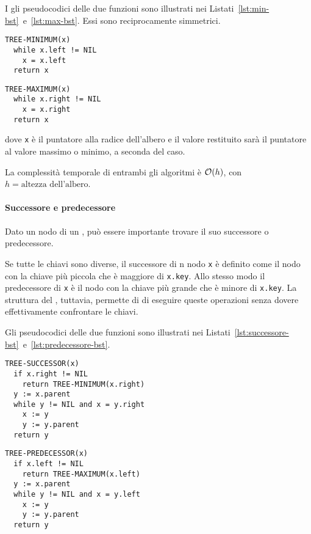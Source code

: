 \documentclass[italian, 10pt]{article}
\begin{document}
I gli pseudocodici delle due funzioni sono illustrati nei Listati~\ref{lst:min-bst}~e~\ref{lst:max-bst}.
Essi sono reciprocamente simmetrici.

\begin{minipage}[t]{0.495\textwidth}
  \begin{lstlisting}[style=pseudocode, caption={Minimo di un BST}, label={lst:min-bst}]
TREE-MINIMUM(x)
  while x.left != NIL
    x = x.left
  return x
  \end{lstlisting}
\end{minipage}
\begin{minipage}[t]{0.495\textwidth}
  \begin{lstlisting}[style=pseudocode, caption={Massimo di un BST}, label={lst:max-bst}]
TREE-MAXIMUM(x)
  while x.right != NIL
    x = x.right
  return x
  \end{lstlisting}
\end{minipage}

dove \texttt{x} è il puntatore alla radice dell'albero e il valore restituito sarà il puntatore al valore massimo o minimo, a seconda del caso.

\bigskip
La complessità temporale di entrambi gli algoritmi è \(\mathcal{O}(h)\), con \(h = \text{altezza dell'albero}\).

\paragraph{Successore e predecessore}
\label{par:successore-predecessore-bst}

Dato un nodo di un \BST, può essere importante trovare il suo successore o predecessore.

Se tutte le chiavi sono diverse, il successore di n nodo \texttt{x} è definito come il nodo con la chiave più piccola che è maggiore di \texttt{x.key}.
Allo stesso modo il predecessore di \texttt{x} è il nodo con la chiave più grande che è minore di \texttt{x.key}.
La struttura del \BST, tuttavia, permette di di eseguire queste operazioni senza dovere effettivamente confrontare le chiavi.

Gli pseudocodici delle due funzioni sono illustrati nei Listati~\ref{lst:successore-bst}~e~\ref{lst:predecessore-bst}.

\begin{minipage}[t]{0.495\textwidth}
  \begin{lstlisting}[style=pseudocode, caption={Successore di di un nodo}, label={lst:successore-bst}]
TREE-SUCCESSOR(x)
  if x.right != NIL
    return TREE-MINIMUM(x.right)
  y := x.parent
  while y != NIL and x = y.right
    x := y
    y := y.parent
  return y
  \end{lstlisting}
\end{minipage}
\begin{minipage}[t]{0.495\textwidth}
  \begin{lstlisting}[style=pseudocode, caption={Predecessore di di un nodo}, label={lst:predecessore-bst}]
TREE-PREDECESSOR(x)
  if x.left != NIL
    return TREE-MAXIMUM(x.left)
  y := x.parent
  while y != NIL and x = y.left
    x := y
    y := y.parent
  return y
      \end{lstlisting}
\end{minipage}
\end{document}
